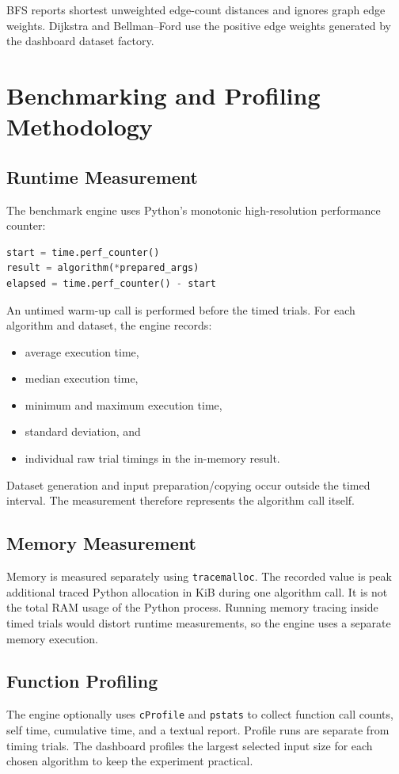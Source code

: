 \documentclass[11pt,a4paper]{report}
\begin{document}
BFS reports shortest unweighted edge-count distances and ignores graph edge
weights. Dijkstra and Bellman--Ford use the positive edge weights generated by
the dashboard dataset factory.

\chapter{Benchmarking and Profiling Methodology}

\section{Runtime Measurement}
The benchmark engine uses Python's monotonic high-resolution performance
counter:
\begin{lstlisting}[language=Python]
start = time.perf_counter()
result = algorithm(*prepared_args)
elapsed = time.perf_counter() - start
\end{lstlisting}

An untimed warm-up call is performed before the timed trials. For each
algorithm and dataset, the engine records:
\begin{itemize}
    \item average execution time,
    \item median execution time,
    \item minimum and maximum execution time,
    \item standard deviation, and
    \item individual raw trial timings in the in-memory result.
\end{itemize}

Dataset generation and input preparation/copying occur outside the timed
interval. The measurement therefore represents the algorithm call itself.

\section{Memory Measurement}
Memory is measured separately using \texttt{tracemalloc}. The recorded value
is peak additional traced Python allocation in KiB during one algorithm call.
It is not the total RAM usage of the Python process. Running memory tracing
inside timed trials would distort runtime measurements, so the engine uses a
separate memory execution.

\section{Function Profiling}
The engine optionally uses \texttt{cProfile} and \texttt{pstats} to collect
function call counts, self time, cumulative time, and a textual report. Profile
runs are separate from timing trials. The dashboard profiles the largest
selected input size for each chosen algorithm to keep the experiment practical.
\end{document}
